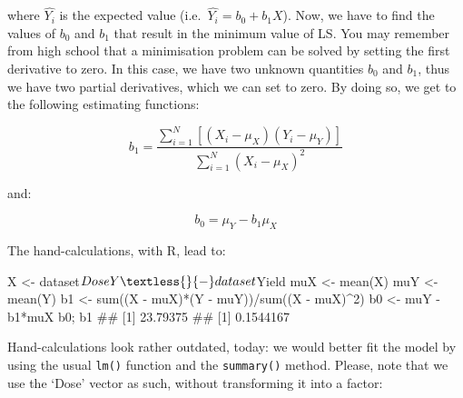 \documentclass[a4paper,12pt,oneside]{book}
\newenvironment{Shaded}{\begin{snugshade}}{\end{snugshade}}
\newcommand{\DecValTok}[1]{#1}
\newcommand{\SpecialCharTok}[1]{#1}
\newcommand{\DocumentationTok}[1]{#1}
\newcommand{\OtherTok}[1]{#1}
\newcommand{\FunctionTok}[1]{#1}
\newcommand{\NormalTok}[1]{#1}
\begin{document}
where \(\hat{Y_i}\) is the expected value (i.e.~\(\hat{Y_i} = b_0 + b_1 X\)). Now, we have to find the values of \(b_0\) and \(b_1\) that result in the minimum value of LS. You may remember from high school that a minimisation problem can be solved by setting the first derivative to zero. In this case, we have two unknown quantities \(b_0\) and \(b_1\), thus we have two partial derivatives, which we can set to zero. By doing so, we get to the following estimating functions:

\[{b_1} = \frac{{\sum\limits_{i = 1}^N {\left[ {\left( {{X_i} - {\mu _X}} \right)\left( {{Y_i} - {\mu _Y}} \right)} \right]} }}{{\sum\limits_{i = 1}^N {{{\left( {{X_i} - {\mu _X}} \right)}^2}} }}\]

and:

\[{b_0} = {\mu _Y} - {b_1}{\mu _X}\]

The hand-calculations, with R, lead to:

\begin{Shaded}
\begin{Highlighting}[]
\NormalTok{X }\OtherTok{\textless{}{-}}\NormalTok{ dataset}\SpecialCharTok{$}\NormalTok{Dose}
\NormalTok{Y }\OtherTok{\textless{}{-}}\NormalTok{ dataset}\SpecialCharTok{$}\NormalTok{Yield}
\NormalTok{muX }\OtherTok{\textless{}{-}} \FunctionTok{mean}\NormalTok{(X)}
\NormalTok{muY }\OtherTok{\textless{}{-}} \FunctionTok{mean}\NormalTok{(Y)}
\NormalTok{b1 }\OtherTok{\textless{}{-}} \FunctionTok{sum}\NormalTok{((X }\SpecialCharTok{{-}}\NormalTok{ muX)}\SpecialCharTok{*}\NormalTok{(Y }\SpecialCharTok{{-}}\NormalTok{ muY))}\SpecialCharTok{/}\FunctionTok{sum}\NormalTok{((X }\SpecialCharTok{{-}}\NormalTok{ muX)}\SpecialCharTok{\^{}}\DecValTok{2}\NormalTok{)}
\NormalTok{b0 }\OtherTok{\textless{}{-}}\NormalTok{ muY }\SpecialCharTok{{-}}\NormalTok{ b1}\SpecialCharTok{*}\NormalTok{muX}
\NormalTok{b0; b1}
\DocumentationTok{\#\# [1] 23.79375}
\DocumentationTok{\#\# [1] 0.1544167}
\end{Highlighting}
\end{Shaded}

Hand-calculations look rather outdated, today: we would better fit the model by using the usual \texttt{lm()} function and the \texttt{summary()} method. Please, note that we use the `Dose' vector as such, without transforming it into a factor:
\end{document}

